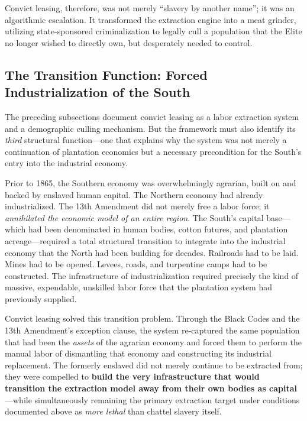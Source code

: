 \documentclass[12pt,openany]{book}
\begin{document}
Convict leasing, therefore, was not merely ``slavery by another name''; it was an algorithmic escalation. It transformed the extraction engine into a meat grinder, utilizing state-sponsored criminalization to legally cull a population that the Elite no longer wished to directly own, but desperately needed to control.

\subsection{The Transition Function: Forced Industrialization of the South}

The preceding subsections document convict leasing as a labor extraction system and a demographic culling mechanism. But the framework must also identify its \textit{third} structural function---one that explains why the system was not merely a continuation of plantation economics but a necessary precondition for the South's entry into the industrial economy.

Prior to 1865, the Southern economy was overwhelmingly agrarian, built on and backed by enslaved human capital. The Northern economy had already industrialized. The 13th Amendment did not merely free a labor force; it \textit{annihilated the economic model of an entire region}. The South's capital base---which had been denominated in human bodies, cotton futures, and plantation acreage---required a total structural transition to integrate into the industrial economy that the North had been building for decades. Railroads had to be laid. Mines had to be opened. Levees, roads, and turpentine camps had to be constructed. The infrastructure of industrialization required precisely the kind of massive, expendable, unskilled labor force that the plantation system had previously supplied.

Convict leasing solved this transition problem. Through the Black Codes and the 13th Amendment's exception clause, the system re-captured the same population that had been the \textit{assets} of the agrarian economy and forced them to perform the manual labor of dismantling that economy and constructing its industrial replacement. The formerly enslaved did not merely continue to be extracted from; they were compelled to \textbf{build the very infrastructure that would transition the extraction model away from their own bodies as capital}---while simultaneously remaining the primary extraction target under conditions documented above as \textit{more lethal} than chattel slavery itself.
\end{document}
